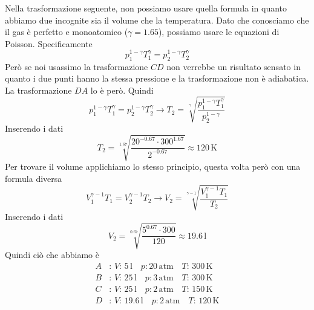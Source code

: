 Nella trasformazione seguente, non possiamo usare quella formula in quanto abbiamo due incognite
sia il volume che la temperatura. Dato che conosciamo che il gas è perfetto e monoatomico ($\gamma =
1.65$), possiamo usare le equazioni di Poisson. Specificamente
\begin{equation*}
  p_1^{1-\gamma}T_1^\gamma = p_2^{1-\gamma}T_2^\gamma
\end{equation*}
Però se noi usassimo la trasformazione $CD$ non verrebbe un risultato sensato in quanto i due punti
hanno la stessa pressione e la trasformazione non è adiabatica. La trasformazione $DA$ lo è però.
Quindi
\begin{equation*}
  p_1^{1-\gamma}T_1^\gamma = p_2^{1-\gamma}T_2^\gamma\rightarrow T_2 = 
  \sqrt[\gamma]{\frac{p_1^{1-\gamma}T_1^\gamma}{p_2^{1-\gamma}}}
\end{equation*}
Inserendo i dati
\begin{equation*}
  T_2 = \sqrt[1.67]{\frac{20^{-0.67}\cdot300^1.67}{2^{-0.67}}} \approx \boxed{120\,\text{K}}
\end{equation*}
Per trovare il volume applichiamo lo stesso principio, questa volta però con una formula diversa
\begin{equation*}
  V_1^{\gamma-1}T_1 = V_2^{\gamma-1}T_2\rightarrow V_2=\sqrt[\gamma-1]{\frac{V_1^{\gamma-1}T_1}{T_2}}
\end{equation*}
Inserendo i dati
\begin{equation*}
  V_2 = \sqrt[0.67]{\frac{5^{0.67}\cdot300}{120}} \approx\boxed{19.6\,\text{l}}
\end{equation*}
Quindi ciò che abbiamo è
\begin{align*}
  A&:\, V:\,5\,\text{l}\quad p:20\,\text{atm}\quad T:\,300\,\text{K}\\
  B&:\, V:\,25\,\text{l}\quad p:3\,\text{atm}\quad T:\,300\,\text{K}\\
  C&:\, V:\,25\,\text{l}\quad p:2\,\text{atm}\quad T:\,150\,\text{K}\\
  D&:\, V:\,19.6\,\text{l}\quad p:2\,\text{atm}\quad T:\,120\,\text{K}
\end{align*}

